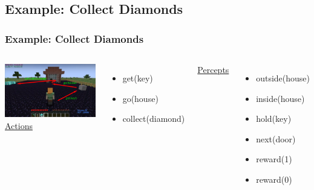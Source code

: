 \documentclass[aspectratio=169]{beamer}
\begin{document}


\subsection{Example: Collect Diamonds}

\begin{frame}
  \frametitle{Example: Collect Diamonds}
  \begin{columns}
    \column{4.4in}
    \includegraphics[scale=0.33]{pictures/minecraft-arrows.png}
    \column{1.7in}
    \underline{Actions}
      \begin{itemize}
      \item get(key)
      \item go(house)
      \item collect(diamond)
      \end{itemize}
    \underline{Percepts}
      \begin{itemize}
      \item outside(house)
      \item inside(house)
      \item hold(key)
      \item next(door)
      \item reward(1)
      \item reward(0)
      \end{itemize}
  \end{columns}
\end{frame}
\end{document}
